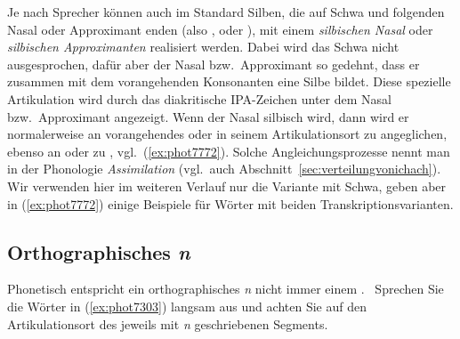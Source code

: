 Je nach Sprecher können auch im Standard Silben, die auf Schwa und folgenden Nasal oder Approximant enden (also \textipa{[@n]}, \textipa{[@m]} oder \textipa{[@l]}), mit einem \textit{silbischen Nasal} oder \textit{silbischen Approximanten} realisiert werden.
Dabei wird das Schwa nicht ausgesprochen, dafür aber der Nasal bzw.\ Approximant so gedehnt, dass er zusammen mit dem vorangehenden Konsonanten eine Silbe bildet.
Diese spezielle Artikulation wird durch das diakritische IPA-Zeichen \textipa{[\s{ }]} unter dem Nasal bzw.\ Approximant angezeigt.
Wenn der Nasal \textipa{[n]} silbisch wird, dann wird er normalerweise an vorangehendes \textipa{[b]} oder \textipa{[p]} in seinem Artikulationsort zu \textipa{[m]} angeglichen, ebenso an \textipa{[g]} oder \textipa{[k]} zu \textipa{[N]}, vgl.\ (\ref{ex:phot7772}).
Solche Angleichungsprozesse nennt man in der Phonologie \textit{Assimilation} (vgl.\ auch Abschnitt~\ref{sec:verteilungvonichach}).
Wir verwenden hier im weiteren Verlauf nur die Variante mit Schwa, geben aber in (\ref{ex:phot7772}) einige Beispiele für Wörter mit beiden Transkriptionsvarianten.

\begin{exe}
  \ex\label{ex:phot7772}
  \begin{xlist}
  \end{xlist}
\end{exe}

\subsection{Orthographisches \textit{n}}

\label{sec:orthographischesn}

Phonetisch entspricht ein orthographisches \textit{n} nicht immer einem \textipa{[n]}.
\TuBegin~Sprechen Sie die Wörter in (\ref{ex:phot7303}) langsam aus und achten Sie auf den Artikulationsort des jeweils mit \textit{n} geschriebenen Segments.

\begin{exe}
  \ex\label{ex:phot7303}
  \begin{xlist}
  \end{xlist}
\end{exe}

